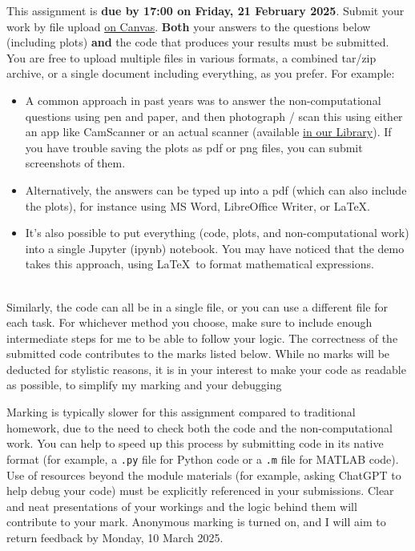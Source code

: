 \documentclass[12 pt]{article} %
\begin{document}
This assignment is \textbf{due by 17:00 on Friday, 21 February 2025}.
Submit your work by file upload \href{https://canvas.liverpool.ac.uk/courses/76365/assignments/297930}{on Canvas}.
\textbf{Both} your answers to the questions below (including plots) \textbf{and} the code that produces your results must be submitted.
You are free to upload multiple files in various formats, a combined tar/zip archive, or a single document including everything, as you prefer.
For example:
 \\[-30 pt]
\begin{itemize}
  \setlength{\itemsep}{1pt}
  \setlength{\parskip}{0pt}
  \setlength{\parsep}{0pt}
\item A common approach in past years was to answer the non-computational questions using pen and paper, and then photograph / scan this using either an app like CamScanner or an actual scanner (available \href{https://libanswers.liverpool.ac.uk/faq/49444}{in our Library}).  If you have trouble saving the plots as pdf or png files, you can submit screenshots of them.
  \item Alternatively, the answers can be typed up into a pdf (which can also include the plots), for instance using MS Word, LibreOffice Writer, or \LaTeX.
  \item It's also possible to put everything (code, plots, and non-computational work) into a single Jupyter (ipynb) notebook.  You may have noticed that the demo takes this approach, using \LaTeX\ to format mathematical expressions.
\end{itemize}
\ \\[-30 pt]
Similarly, the code can all be in a single file, or you can use a different file for each task.
For whichever method you choose, make sure to include enough intermediate steps for me to be able to follow your logic.
The correctness of the submitted code contributes to the marks listed below.
While no marks will be deducted for stylistic reasons, it is in your interest to make your code as readable as possible, to simplify my marking and your debugging

Marking is typically slower for this assignment compared to traditional homework, due to the need to check both the code and the non-computational work.
You can help to speed up this process by submitting code in its native format (for example, a \texttt{.py} file for Python code or a \texttt{.m} file for MATLAB code).
Use of resources beyond the module materials (for example, asking ChatGPT to help debug your code) must be explicitly referenced in your submissions.
Clear and neat presentations of your workings and the logic behind them will contribute to your mark.
Anonymous marking is turned on, and I will aim to return feedback by Monday, 10 March 2025.
\end{document}
